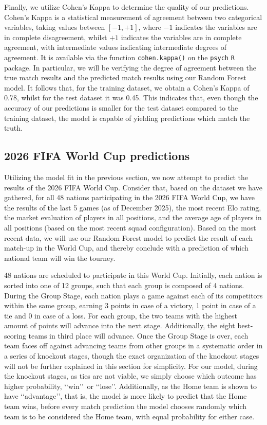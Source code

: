 \documentclass[12pt,paper=letter,leqno]{scrartcl}
\begin{document}
Finally, we utilize Cohen's Kappa to determine the quality of our predictions. Cohen's Kappa is a statistical measurement of agreement between two categorical variables, taking values between $[-1,+1]$, where $-1$ indicates the variables are in complete disagreement, whilst $+1$ indicates the variables are in complete agreement, with intermediate values indicating intermediate degrees of agreement. It is available via the function \texttt{cohen.kappa()} on the \texttt{psych} \texttt{R} package. In particular, we will be verifying the degree of agreement between the true match results and the predicted match results using our Random Forest model. It follows that, for the training dataset, we obtain a Cohen's Kappa of 0.78, whilst for the test dataset it was 0.45. This indicates that, even though the accuracy of our predictions is smaller for the test dataset compared to the training dataset, the model is capable of yielding predictions which match the truth.

\subsection{2026 FIFA World Cup predictions}

Utilizing the model fit in the previous section, we now attempt to predict the results of the 2026 FIFA World Cup. Consider that, based on the dataset we have gathered, for all 48 nations participating in the 2026 FIFA World Cup, we have the results of the last 5 games (as of December 2025), the most recent Elo rating, the market evaluation of players in all positions, and the average age of players in all positions (based on the most recent squad configuration). Based on the most recent data, we will use our Random Forest model to predict the result of each match-up in the World Cup, and thereby conclude with a prediction of which national team will win the tourney.

48 nations are scheduled to participate in this World Cup. Initially, each nation is sorted into one of 12 groups, such that each group is composed of 4 nations. During the Group Stage, each nation plays a game against each of its competitors within the same group, earning 3 points in case of a victory, 1 point in case of a tie and 0 in case of a loss. For each group, the two teams with the highest amount of points will advance into the next stage. Additionally, the eight best-scoring teams in third place will advance. Once the Group Stage is over, each team faces off against advancing teams from other groups in a systematic order in a series of knockout stages, though the exact organization of the knockout stages will not be further explained in this section for simplicity. For our model, during the knockout stages, as ties are not viable, we simply choose which outcome has higher probability, \lq\lq win\rq\rq\ or \lq\lq lose\rq\rq. Additionally, as the Home team is shown to have \lq\lq advantage\rq\rq, that is, the model is more likely to predict that the Home team wins, before every match prediction the model chooses randomly which team is to be considered the Home team, with equal probability for either case.
\end{document}
